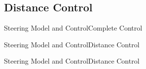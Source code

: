 
\subsection{Distance Control}

\begin{frame}{Steering Model and Control}{Complete Control}
  \begin{figure}[H]
    \centering
  \end{figure}
\end{frame}

\begin{frame}{Steering Model and Control}{Distance Control}
  \begin{figure}[H]
    \centering
  \end{figure}
\end{frame}


\begin{frame}{Steering Model and Control}{Distance Control}
  \begin{figure}[H]
    \centering
  \end{figure}
\end{frame}


